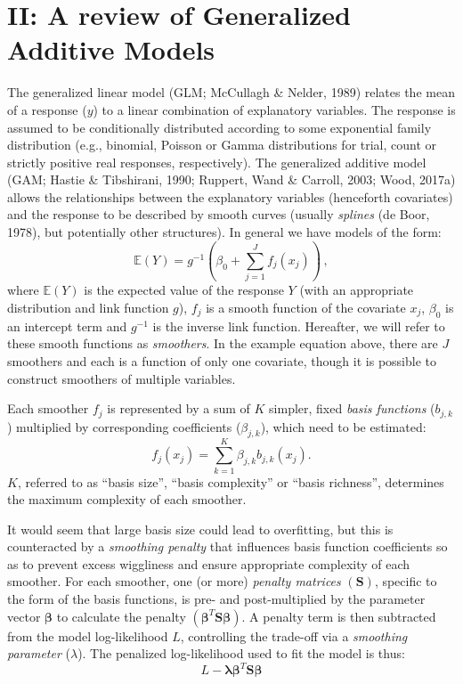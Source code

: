 \documentclass[12pt]{article}
\begin{document}
\FloatBarrier

\section{II: A review of Generalized Additive
Models}\label{ii-a-review-of-generalized-additive-models}

The generalized linear model (GLM; McCullagh \& Nelder, 1989) relates
the mean of a response (\(y\)) to a linear combination of explanatory
variables. The response is assumed to be conditionally distributed
according to some exponential family distribution (e.g., binomial,
Poisson or Gamma distributions for trial, count or strictly positive
real responses, respectively). The generalized additive model (GAM;
Hastie \& Tibshirani, 1990; Ruppert, Wand \& Carroll, 2003; Wood, 2017a)
allows the relationships between the explanatory variables (henceforth
covariates) and the response to be described by smooth curves (usually
\emph{splines} (de Boor, 1978), but potentially other structures). In
general we have models of the form: \[
\mathbb{E}\left( Y \right) = g^{-1}\left( \beta_0 + \sum_{j=1}^J f_j(x_j) \right)\,,
\] where \(\mathbb{E}(Y)\) is the expected value of the response \(Y\)
(with an appropriate distribution and link function \(g\)), \(f_j\) is a
smooth function of the covariate \(x_j\), \(\beta_0\) is an intercept
term and \(g^{-1}\) is the inverse link function. Hereafter, we will
refer to these smooth functions as \emph{smoothers}. In the example
equation above, there are \(J\) smoothers and each is a function of only
one covariate, though it is possible to construct smoothers of multiple
variables.

Each smoother \(f_j\) is represented by a sum of \(K\) simpler, fixed
\emph{basis functions} (\(b_{j,k}\)) multiplied by corresponding
coefficients (\(\beta_{j,k}\)), which need to be estimated: \[
f_j(x_j) = \sum_{k=1}^K \beta_{j,k} b_{j,k}(x_j).
\] \(K\), referred to as ``basis size'', ``basis complexity'' or ``basis
richness'', determines the maximum complexity of each smoother.

It would seem that large basis size could lead to overfitting, but this
is counteracted by a \emph{smoothing penalty} that influences basis
function coefficients so as to prevent excess wiggliness and ensure
appropriate complexity of each smoother. For each smoother, one (or
more) \emph{penalty matrices} \((\mathbf{S})\), specific to the form of
the basis functions, is pre- and post-multiplied by the parameter vector
\(\boldsymbol{\beta}\) to calculate the penalty
\((\boldsymbol{\beta}^T \mathbf{S} \boldsymbol{\beta})\). A penalty term
is then subtracted from the model log-likelihood \(L\), controlling the
trade-off via a \emph{smoothing parameter} (\(\lambda\)). The penalized
log-likelihood used to fit the model is thus: \[
L - \boldsymbol{\lambda} \boldsymbol{\beta}^T \mathbf{S} \boldsymbol{\beta}
\]
\end{document}
